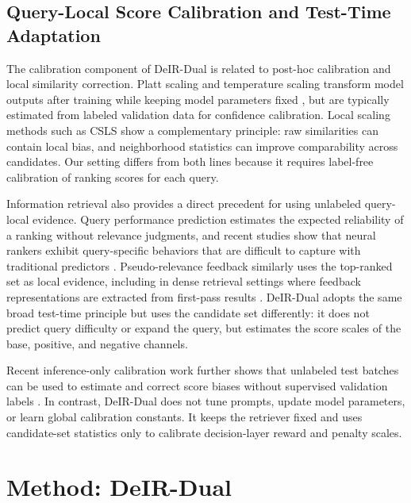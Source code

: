 \documentclass[letterpaper]{article}
\newcommand{\method}{DeIR-Dual}
\begin{document}
\subsection{Query-Local Score Calibration and Test-Time Adaptation}

The calibration component of \method{} is related to post-hoc
calibration and local similarity correction.  Platt scaling and
temperature scaling transform model outputs after training while
keeping model parameters fixed
\cite{platt1999probabilistic,guo2017temperature}, but are typically
estimated from labeled validation data for confidence calibration.
Local scaling methods such as CSLS \cite{conneau2018wordtranslation}
show a complementary principle: raw similarities can contain local
bias, and neighborhood statistics can improve comparability across
candidates.  Our setting differs from both lines because it requires
label-free calibration of ranking scores for each query.

Information retrieval also provides a direct precedent for using
unlabeled query-local evidence.  Query performance prediction estimates
the expected reliability of a ranking without relevance judgments, and
recent studies show that neural rankers exhibit query-specific
behaviors that are difficult to capture with traditional predictors
\cite{faggioli2023query}.  Pseudo-relevance feedback similarly uses the
top-ranked set as local evidence, including in dense retrieval settings
where feedback representations are extracted from first-pass results
\cite{wang2021pseudo}.  \method{} adopts the same broad test-time
principle but uses the candidate set differently: it does not predict
query difficulty or expand the query, but estimates the score scales of
the base, positive, and negative channels.

Recent inference-only calibration work further shows that unlabeled
test batches can be used to estimate and correct score biases without
supervised validation labels \cite{zhou2024batch}.  In contrast,
\method{} does not tune prompts, update model parameters, or learn
global calibration constants.  It keeps the retriever fixed and uses
candidate-set statistics only to calibrate decision-layer reward and
penalty scales.

\section{Method: DeIR-Dual}
\label{sec:method}
\end{document}
